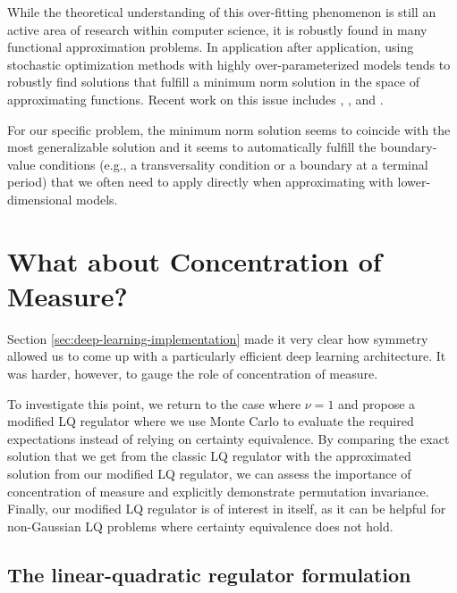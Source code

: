 \documentclass[12pt]{article}
\begin{document}
While the theoretical understanding of this over-fitting phenomenon is still an active area of research within computer science, it is robustly found in many functional approximation problems. In application after application, using stochastic optimization methods with highly over-parameterized models tends to robustly find solutions that fulfill a minimum norm solution in the space of approximating functions. Recent work on this issue includes \citet{pmlr-v80-arora18b}, \citet{allen2019convergence}, and \citet{nakkiran2019deep}.

For our specific problem, the minimum norm solution seems to coincide with the most generalizable solution and it seems to automatically fulfill the boundary-value conditions (e.g., a transversality condition or a boundary at a terminal period) that we often need to apply directly when approximating with lower-dimensional models.

\section{What about Concentration of Measure?}\label{sec:linear-price}

Section \ref{sec:deep-learning-implementation} made it very clear how symmetry allowed us to come up with a particularly efficient deep learning architecture. It was harder, however, to gauge the role of concentration of measure.

To investigate this point, we return to the case where $\nu= 1$ and propose a modified LQ regulator where we use Monte Carlo to evaluate the required expectations instead of relying on certainty equivalence. By comparing the exact solution that we get from the classic LQ regulator with the approximated solution from our modified LQ regulator, we can assess the importance of concentration of measure and explicitly demonstrate permutation invariance. Finally, our modified LQ regulator is of interest in itself, as it can be helpful for non-Gaussian LQ problems where certainty equivalence does not hold. 

\subsection{The linear-quadratic regulator formulation}\label{sec:linear-price-LQ}
\end{document}
